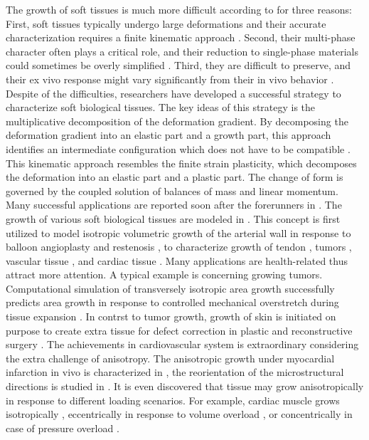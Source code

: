 The growth of soft tissues is much more difficult according to \cite{Menzel} for three reasons: First, soft tissues typically undergo large deformations and their accurate characterization requires a finite kinematic approach \cite{Rodriguez}. Second, their multi-phase character often plays a critical role, and their reduction to single-phase materials could sometimes be overly simplified \cite{Mow}. Third, they are difficult to preserve, and their ex vivo response might vary significantly from their in vivo behavior \cite{Krishnamurthy}. Despite of the difficulties, researchers have developed a successful strategy to characterize soft biological tissues. The key ideas of this strategy is the multiplicative decomposition of the deformation gradient. By decomposing the deformation gradient into an elastic part and a growth part, this approach identifies an intermediate configuration which does not have to be compatible \cite{Goriely, Menzel2, Rodriguez}. This kinematic approach resembles the finite strain plasticity, which decomposes the deformation into an elastic part and a plastic part. The change of form is governed by the coupled solution of balances of mass and linear momentum. Many successful applications are reported soon after the forerunners in \cite{Hsu, Skalak}. The growth of various soft biological tissues are modeled in \cite{Garikipati, Lubarda}. This concept is first utilized to model isotropic volumetric growth of the arterial wall in response to balloon angioplasty and restenosis \cite{Himpel, Kuhl3}, to characterize growth of tendon \cite{Garikipati2}, tumors \cite{Ambrosi2}, vascular tissue \cite{Humphrey2, Humphrey3, Taber}, and cardiac tissue \cite{Kroon, Goktepe}. Many applications are health-related thus attract more attention. A typical example is concerning growing tumors. Computational simulation of transversely isotropic area growth successfully predicts area growth in response to controlled mechanical overstretch during tissue expansion \cite{Zollner}. In contrst to tumor growth, growth of skin is initiated on purpose to create extra tissue for defect correction in plastic and reconstructive surgery \cite{Zollner2}. The achievements in cardiovascular system is extraordinary considering the extra challenge of anisotropy. The anisotropic growth under myocardial infarction in vivo is characterized in \cite{Tsamis}, the reorientation of the microstructural directions is studied in \cite{Kuhl4, Kuhl5}. It is even discovered that tissue may grow anisotropically in response to different loading scenarios. For example, cardiac muscle grows isotropically \cite{Kroon}, eccentrically in response to volume overload \cite{Goktepe2}, or concentrically in case of pressure overload \cite{Rausch}.

